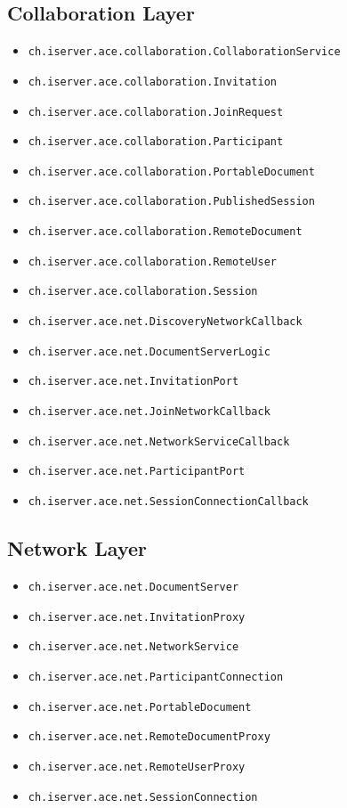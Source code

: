 \subsection{Collaboration Layer}
\begin{itemize}
 \item \texttt{ch.iserver.ace.collaboration.CollaborationService}
 \item \texttt{ch.iserver.ace.collaboration.Invitation}
 \item \texttt{ch.iserver.ace.collaboration.JoinRequest}
 \item \texttt{ch.iserver.ace.collaboration.Participant}
 \item \texttt{ch.iserver.ace.collaboration.PortableDocument}
 \item \texttt{ch.iserver.ace.collaboration.PublishedSession}
 \item \texttt{ch.iserver.ace.collaboration.RemoteDocument}
 \item \texttt{ch.iserver.ace.collaboration.RemoteUser}
 \item \texttt{ch.iserver.ace.collaboration.Session}
 \item \texttt{ch.iserver.ace.net.DiscoveryNetworkCallback}
 \item \texttt{ch.iserver.ace.net.DocumentServerLogic}
 \item \texttt{ch.iserver.ace.net.InvitationPort}
 \item \texttt{ch.iserver.ace.net.JoinNetworkCallback}
 \item \texttt{ch.iserver.ace.net.NetworkServiceCallback}
 \item \texttt{ch.iserver.ace.net.ParticipantPort}
 \item \texttt{ch.iserver.ace.net.SessionConnectionCallback}  
\end{itemize}

\subsection{Network Layer}
\begin{itemize}
 \item \texttt{ch.iserver.ace.net.DocumentServer}
 \item \texttt{ch.iserver.ace.net.InvitationProxy}
 \item \texttt{ch.iserver.ace.net.NetworkService}
 \item \texttt{ch.iserver.ace.net.ParticipantConnection}
 \item \texttt{ch.iserver.ace.net.PortableDocument}
 \item \texttt{ch.iserver.ace.net.RemoteDocumentProxy}
 \item \texttt{ch.iserver.ace.net.RemoteUserProxy}
 \item \texttt{ch.iserver.ace.net.SessionConnection}     
\end{itemize}
